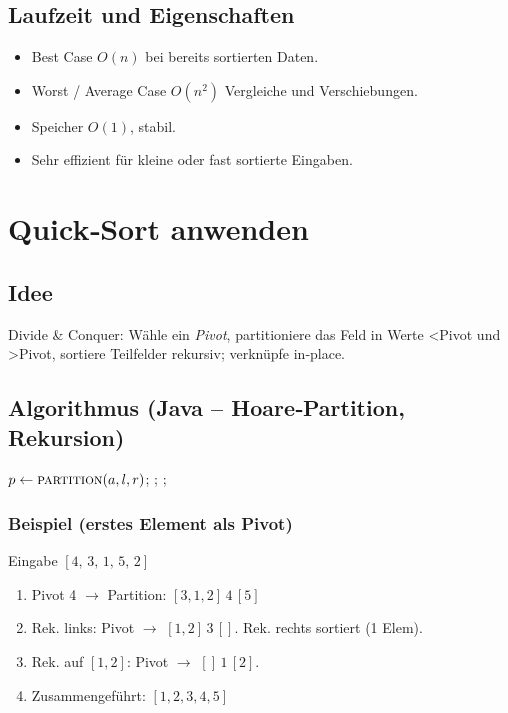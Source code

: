 \subsection*{Laufzeit und Eigenschaften}
\begin{itemize}
  \item Best Case $O(n)$ bei bereits sortierten Daten.\par
  \item Worst / Average Case $O(n^{2})$ Vergleiche und Verschiebungen.\par
  \item Speicher $O(1)$, stabil.\par
  \item Sehr effizient für kleine oder fast sortierte Eingaben.
\end{itemize}

\section{Quick‑Sort anwenden}
\subsection*{Idee}
Divide \& Conquer: Wähle ein \emph{Pivot}, partitioniere das Feld in Werte
<Pivot und >Pivot, sortiere Teilfelder rekursiv; verknüpfe in‑place.

\subsection*{Algorithmus (Java – Hoare‑Partition, Rekursion)}
\begin{algorithmic}
    \State $p \gets \Call{partition}{a,l,r}$; 
    \State {};
    \State {};
  \EndIf
\EndFunction
\end{algorithmic}

\subsubsection*{Beispiel (erstes Element als Pivot)}
Eingabe \([4,\,3,\,1,\,5,\,2]\)
\begin{enumerate}[label=\alph*)]
  \item Pivot 4 $\rightarrow$ Partition: \([3,1,2]\,4\,[5]\)
  \item Rek. links: Pivot $\rightarrow$ \([1,2]\,3\,[]\).  Rek. rechts sortiert (1 Elem).
  \item Rek. auf \([1,2]\): Pivot $\rightarrow$ \([]\,1\,[2]\).
  \item Zusammengeführt: \([1,2,3,4,5]\)
\end{enumerate}

